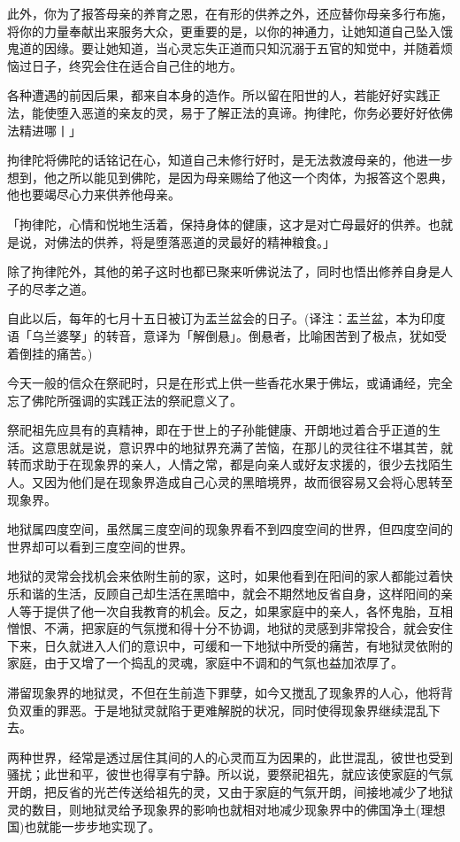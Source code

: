 \documentclass[12pt,twoside,openany]{book}
\begin{document}
此外，你为了报答母亲的养育之恩，在有形的供养之外，还应替你母亲多行布施，将你的力量奉献出来服务大众，更重要的是，以你的神通力，让她知道自己坠入饿鬼道的因缘。要让她知道，当心灵忘失正道而只知沉溺于五官的知觉中，并随着烦恼过日子，终究会住在适合自己住的地方。

各种遭遇的前因后果，都来自本身的造作。所以留在阳世的人，若能好好实践正法，能使堕入恶道的亲友的灵，易于了解正法的真谛。拘律陀，你务必要好好依佛法精进哪丨」

拘律陀将佛陀的话铭记在心，知道自己未修行好时，是无法救渡母亲的，他进一步想到，他之所以能见到佛陀，是因为母亲赐给了他这一个肉体，为报答这个恩典，他也要竭尽心力来供养他母亲。

「拘律陀，心情和悦地生活着，保持身体的健康，这才是对亡母最好的供养。也就是说，对佛法的供养，将是堕落恶道的灵最好的精神粮食。」

除了拘律陀外，其他的弟子这时也都已聚来听佛说法了，同时也悟出修养自身是人子的尽孝之道。

自此以后，每年的七月十五日被订为盂兰盆会的日子。(译注：盂兰盆，本为印度语「乌兰婆孥」的转音，意译为「解倒悬」。倒悬者，比喻困苦到了极点，犹如受着倒挂的痛苦。)

今天一般的信众在祭祀时，只是在形式上供一些香花水果于佛坛，或诵诵经，完全忘了佛陀所强调的实践正法的祭祀意义了。

祭祀祖先应具有的真精神，即在于世上的子孙能健康、开朗地过着合乎正道的生活。这意思就是说，意识界中的地狱界充满了苦恼，在那儿的灵往往不堪其苦，就转而求助于在现象界的亲人，人情之常，都是向亲人或好友求援的，很少去找陌生人。又因为他们是在现象界造成自己心灵的黑暗境界，故而很容易又会将心思转至现象界。

地狱属四度空间，虽然属三度空间的现象界看不到四度空间的世界，但四度空间的世界却可以看到三度空间的世界。

地狱的灵常会找机会来依附生前的家，这时，如果他看到在阳间的家人都能过着快乐和谐的生活，反顾自己却生活在黑暗中，就会不期然地反省自身，这样阳间的亲人等于提供了他一次自我教育的机会。反之，如果家庭中的亲人，各怀鬼胎，互相憎恨、不满，把家庭的气氛搅和得十分不协调，地狱的灵感到非常投合，就会安住下来，日久就进入人们的意识中，可缓和一下地狱中所受的痛苦，有地狱灵依附的家庭，由于又增了一个捣乱的灵魂，家庭中不调和的气氛也益加浓厚了。

滞留现象界的地狱灵，不但在生前造下罪孽，如今又搅乱了现象界的人心，他将背负双重的罪恶。于是地狱灵就陷于更难解脱的状况，同时使得现象界继续混乱下去。

两种世界，经常是透过居住其间的人的心灵而互为因果的，此世混乱，彼世也受到骚扰；此世和平，彼世也得享有宁静。所以说，要祭祀祖先，就应该使家庭的气氛开朗，把反省的光芒传送给祖先的灵，又由于家庭的气氛开朗，间接地减少了地狱灵的数目，则地狱灵给予现象界的影响也就相对地减少现象界中的佛国净土(理想国)也就能一步步地实现了。
\end{document}
